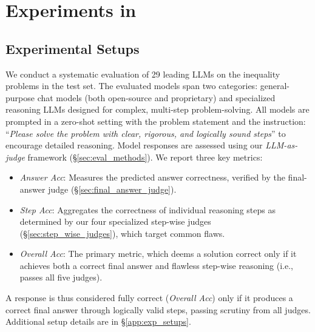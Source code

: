 \vspace{-2mm}
\section{Experiments in \dataset}
\label{sec:experiments}
\vspace{-3mm}

\subsection{Experimental Setups}
\label{sec:exp_setups}
\vspace{-2mm}

We conduct a systematic evaluation of 29 leading LLMs on the inequality problems in the \dataset test set. The evaluated models span two categories: general-purpose chat models (both open-source and proprietary) and specialized reasoning LLMs designed for complex, multi-step problem-solving. All models are prompted in a zero-shot setting with the problem statement and the instruction: ``\textit{Please solve the problem with clear, rigorous, and logically sound steps}'' to encourage detailed reasoning.
Model responses are assessed using our \textit{LLM-as-judge} framework (\S\ref{sec:eval_methods}). We report three key metrics:
\vspace{-2mm}
\begin{itemize}[leftmargin=1.0em,  %
                itemsep=0pt,       %
                topsep=1pt]        %
\item \textit{Answer Acc}: Measures the predicted answer correctness, verified by the final-answer judge (\S\ref{sec:final_answer_judge}).
\item \textit{Step Acc}: Aggregates the correctness of individual reasoning steps as determined by our four specialized step-wise judges (\S\ref{sec:step_wise_judges}), which target common flaws.
\item \textit{Overall Acc}: The primary metric, which deems a solution correct only if it achieves both a correct final answer and flawless step-wise reasoning (i.e., passes all five judges).
\end{itemize}
\vspace{-2mm}
A response is thus considered fully correct (\textit{Overall Acc}) only if it produces a correct final answer through logically valid steps, passing scrutiny from all judges. Additional setup details are in \S\ref{app:exp_setups}.

